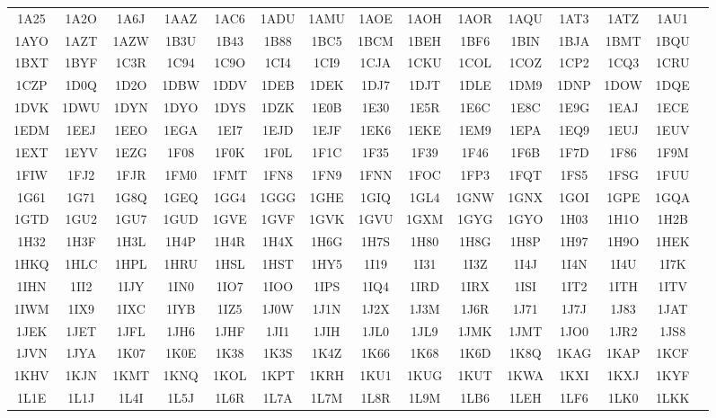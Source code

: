 \begingroup
\fontsize{6pt}{8pt}\selectfont
\centering
	\begin{longtable}{ c c c c c c c c c c c c c c c }
	1A25 & 1A2O & 1A6J & 1AAZ & 1AC6 & 1ADU & 1AMU & 1AOE & 1AOH & 1AOR & 1AQU & 1AT3 & 1ATZ & 1AU1  \\
	1AYO & 1AZT & 1AZW & 1B3U & 1B43 & 1B88 & 1BC5 & 1BCM & 1BEH & 1BF6 & 1BIN & 1BJA & 1BMT & 1BQU  \\
	1BXT & 1BYF & 1C3R & 1C94 & 1C9O & 1CI4 & 1CI9 & 1CJA & 1CKU & 1COL & 1COZ & 1CP2 & 1CQ3 & 1CRU  \\
	1CZP & 1D0Q & 1D2O & 1DBW & 1DDV & 1DEB & 1DEK & 1DJ7 & 1DJT & 1DLE & 1DM9 & 1DNP & 1DOW & 1DQE  \\
	1DVK & 1DWU & 1DYN & 1DYO & 1DYS & 1DZK & 1E0B & 1E30 & 1E5R & 1E6C & 1E8C & 1E9G & 1EAJ & 1ECE  \\
	1EDM & 1EEJ & 1EEO & 1EGA & 1EI7 & 1EJD & 1EJF & 1EK6 & 1EKE & 1EM9 & 1EPA & 1EQ9 & 1EUJ & 1EUV  \\
	1EXT & 1EYV & 1EZG & 1F08 & 1F0K & 1F0L & 1F1C & 1F35 & 1F39 & 1F46 & 1F6B & 1F7D & 1F86 & 1F9M  \\
	1FIW & 1FJ2 & 1FJR & 1FM0 & 1FMT & 1FN8 & 1FN9 & 1FNN & 1FOC & 1FP3 & 1FQT & 1FS5 & 1FSG & 1FUU  \\
	1G61 & 1G71 & 1G8Q & 1GEQ & 1GG4 & 1GGG & 1GHE & 1GIQ & 1GL4 & 1GNW & 1GNX & 1GOI & 1GPE & 1GQA  \\
	1GTD & 1GU2 & 1GU7 & 1GUD & 1GVE & 1GVF & 1GVK & 1GVU & 1GXM & 1GYG & 1GYO & 1H03 & 1H1O & 1H2B  \\
	1H32 & 1H3F & 1H3L & 1H4P & 1H4R & 1H4X & 1H6G & 1H7S & 1H80 & 1H8G & 1H8P & 1H97 & 1H9O & 1HEK  \\
	1HKQ & 1HLC & 1HPL & 1HRU & 1HSL & 1HST & 1HY5 & 1I19 & 1I31 & 1I3Z & 1I4J & 1I4N & 1I4U & 1I7K  \\
	1IHN & 1II2 & 1IJY & 1IN0 & 1IO7 & 1IOO & 1IPS & 1IQ4 & 1IRD & 1IRX & 1ISI & 1IT2 & 1ITH & 1ITV  \\
	1IWM & 1IX9 & 1IXC & 1IYB & 1IZ5 & 1J0W & 1J1N & 1J2X & 1J3M & 1J6R & 1J71 & 1J7J & 1J83 & 1JAT  \\
	1JEK & 1JET & 1JFL & 1JH6 & 1JHF & 1JI1 & 1JIH & 1JL0 & 1JL9 & 1JMK & 1JMT & 1JO0 & 1JR2 & 1JS8  \\
	1JVN & 1JYA & 1K07 & 1K0E & 1K38 & 1K3S & 1K4Z & 1K66 & 1K68 & 1K6D & 1K8Q & 1KAG & 1KAP & 1KCF  \\
	1KHV & 1KJN & 1KMT & 1KNQ & 1KOL & 1KPT & 1KRH & 1KU1 & 1KUG & 1KUT & 1KWA & 1KXI & 1KXJ & 1KYF  \\
	1L1E & 1L1J & 1L4I & 1L5J & 1L6R & 1L7A & 1L7M & 1L8R & 1L9M & 1LB6 & 1LEH & 1LF6 & 1LK0 & 1LKK  \\

\end{longtable}
